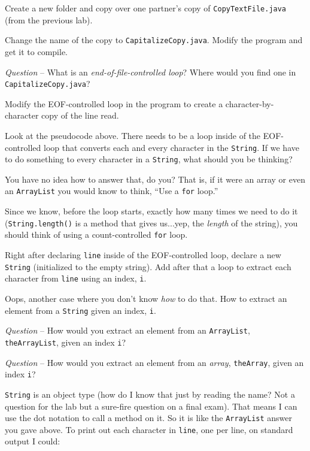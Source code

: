 \documentclass[12pt,oneside]{memoir}
\newcommand\code[1]{\lstinline^#1^}
\newcommand\fname[1]{\texttt{#1}}
\newcounter{LabPhase}
\newenvironment{LabExercises}{%
\renewcommand{\ExerciseListName}{Question}%
\renewcommand{\ExerciseListHeader}{\textbf{%
   Phase\ExerciseHeaderNB. }}
\begin{ExerciseList}}%
{\end{ExerciseList}}
\newcommand{\LabExercise}{\Exercise[name={Lab Phase\ExerciseHeaderNB},counter={LabPhase}]}
\newcounter{myQuestion}
\newcommand{\myQuestion}{\addtocounter{myQuestion}{1}\emph{Question \themyQuestion}-- }
\begin{document}
\begin{LabExercises}
  \LabExercise Create a new folder and copy over one partner's copy of
  \fname{CopyTextFile.java} (from the previous lab). 

  Change the name of the copy to \fname{CapitalizeCopy.java}. Modify
  the program and get it to compile.

  \myQuestion What is an \emph{end-of-file-controlled loop}? Where
  would you find one in \fname{CapitalizeCopy.java}?
  
  \LabExercise Modify the EOF-controlled loop in the program to create
  a character-by-character copy of the line read.

  Look at the pseudocode above. There needs to be a loop inside of the
  EOF-controlled loop that converts each and every character in the
  \code{String}. If we have to do something to every character in a
  \code{String}, what should you be thinking?

  You have no idea how to answer that, do you? That is, if it were an
  array or even an \code{ArrayList} you would know to think, ``Use a
  \code{for} loop.'' 

  Since we know, before the loop starts, exactly how many times we
  need to do it (\code{String.length()} is a method that gives
  us...yep, the \emph{length} of the string), you should think of
  using a count-controlled \code{for} loop. 

  Right after declaring \code{line} inside of the EOF-controlled loop,
  declare a new \code{String} (initialized to the empty string). Add
  after that a loop to extract each character from \code{line} using
  an index, \code{i}. 

  Oops, another case where you don't know \emph{how} to do that. How
  to extract an element from a \code{String} given an index, \code{i}.

  \myQuestion How would you extract an element from an
  \code{ArrayList}, \code{theArrayList}, given an index \code{i}?

  \myQuestion How would you extract an element from an \emph{array},
  \code{theArray}, given an index \code{i}?

  \code{String} is an object type (how do I know that just by reading
  the name? Not a question for the lab but a sure-fire question on a
  final exam). That means I can use the dot notation to call a method
  on it. So it is like the \code{ArrayList} answer you gave above. To
  print out each character in \code{line}, one per line, on standard
  output I could:


\end{LabExercises}
\end{document}

